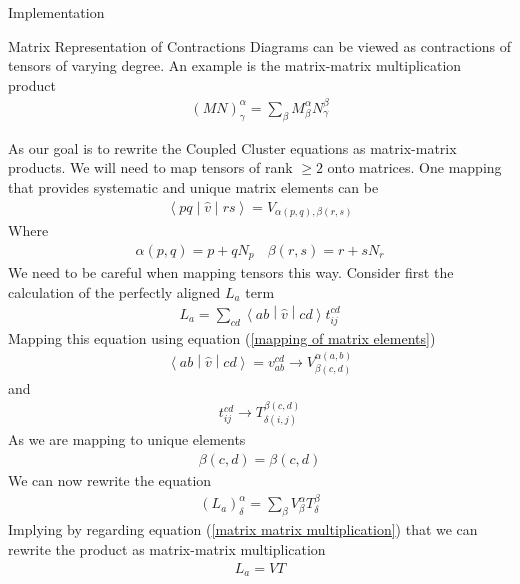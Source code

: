 \documentclass[twoside,english]{uiofysmaster}
\begin{document}
\begin{chapter}{Implementation}
	
	\begin{section}{Matrix Representation of Contractions}
		Diagrams can be viewed as contractions of tensors of varying degree. An example is the matrix-matrix multiplication product
		\begin{align}
		 	\left( M N \right)_{\gamma}^{\alpha} = \sum_{\beta} M_{\beta}^\alpha N_\gamma^\beta 
		 	\label{matrix matrix multiplication}
		\end{align} 

		As our goal is to rewrite the Coupled Cluster equations as matrix-matrix products. We will need to map tensors of rank $\geq 2$ onto matrices. One mapping that provides systematic and unique matrix elements can be 
		\begin{align}
			\left<pq\middle| \hat v\middle|rs\right> = V_{\alpha(p,q),\beta(r,s)}
		\end{align}
		Where 
		\begin{align}
			\alpha(p,q) = p + q N_p \;\,\:\; \beta(r,s) = r + s N_r
			\label{mapping of matrix elements}
		\end{align}
		We need to be careful when mapping tensors this way. Consider first the calculation of the perfectly aligned $L_a$ term
		\begin{align}
			L_a = \sum_{cd} \left< ab \middle| \hat v\middle|cd\right> t_{ij}^{cd}
		\end{align}
		Mapping this equation using equation (\ref{mapping of matrix elements})
		\begin{align}
			\left< ab \middle| \hat v\middle|cd\right> = v_{ab}^{cd} \rightarrow V_{\beta(c,d)}^{\alpha(a,b)}
		\end{align}
		and
		\begin{align}
			t_{ij}^{cd} \rightarrow T_{\delta(i,j)}^{\beta(c,d)}
		\end{align}
		As we are mapping to unique elements 
		\begin{align}
			\beta(c,d) = \beta(c,d)
		\end{align}
		We can now rewrite the equation 
		\begin{align}
			(L_a)_ \delta^\alpha = \sum_ \beta V_ \beta^\alpha T_ \delta^\beta
		\end{align}
		Implying by regarding equation (\ref{matrix matrix multiplication}) that we can rewrite the product as matrix-matrix multiplication 
		\begin{align}
			L_a = VT
		\end{align}


\end{section}
\end{chapter}
\end{document}
